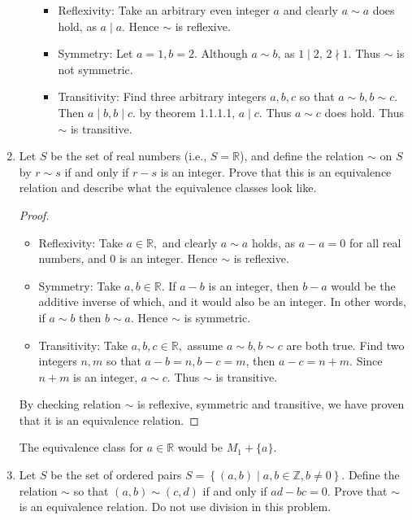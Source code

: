 \documentclass[11pt,a4paper]{article}
\newcommand{\Z}{\mathbb{Z}}
\begin{document}
\begin{enumerate}
\begin{enumerate}
			\begin{itemize}
				\item Reflexivity: Take an arbitrary even integer $a$ and clearly $a\sim a$ does hold, as $a \mid a$. Hence $\sim$ is reflexive.
				\item Symmetry: Let $a=1, b=2.$ Although $a \sim b$, as $1 \mid 2$, $2 \nmid 1$.  Thus $\sim$ is not symmetric.
				\item Transitivity: Find three arbitrary integers $a,b,c$ so that $a\sim b, b\sim c.$ Then $a \mid b, b\mid c$. by theorem 1.1.1.1, $a \mid c$. Thus $a\sim c$ does hold. Thus $\sim$ is transitive.
			\end{itemize}
	\end{enumerate}

	\item Let \(S\) be the set of real numbers (i.e., \(S = \mathbb{R}\)), and define the relation \(\sim\) on \(S\) by \(r \sim s\) if and only if \(r-s\) is an integer. Prove that this is an equivalence relation and describe what the equivalence classes look like.

	\begin{proof}
		\begin{itemize}
			\item Reflexivity: Take $a \in \mathbb{R},$ and clearly $a\sim a$ holds, as $a-a=0$ for all real numbers, and 0 is an integer. Hence $\sim$ is reflexive.
			\item Symmetry: Take $a,b \in \mathbb{R}.$ If $a-b$ is an integer, then $b-a$ would be the additive inverse of which, and it would also be an integer. In other words, if $a \sim b$ then $b \sim a.$ Hence $\sim$ is symmetric.
			\item Transitivity: Take $a,b,c \in \mathbb{R},$ assume $a\sim b, b\sim c$ are both true. Find two integers $n, m$ so that $a-b = n, b-c=m$, then $a-c = n+m.$ Since $n+m$ is an integer, $a \sim c.$ Thus $\sim$ is transitive.
		\end{itemize}
		By checking relation $\sim$ is reflexive, symmetric and transitive, we have proven that it is an equivalence relation.
	\end{proof}

	The equivalence class for $a \in \mathbb{R}$ would be $M_1 + \{ a \} .$

	\item Let \(S\) be the set of ordered pairs \(S = \left\{(a,b) \mid a,b \in \Z, b \ne 0 \right\}\). Define the relation \(\sim\) so that \((a,b) \sim (c,d)\) if and only if \(ad-bc = 0\). Prove that \(\sim\) is an equivalence relation. Do not use division in this problem.


\end{enumerate}
\end{document}
